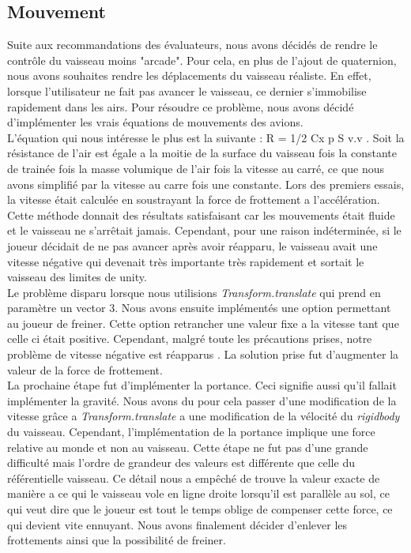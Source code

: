 \documentclass[10pt, titlepage]{report}
\begin{document}
\subsection{Mouvement}
Suite aux recommandations des évaluateurs, nous avons décidés de rendre le contrôle du vaisseau moins "arcade". Pour cela, en plus de l'ajout de quaternion, nous avons souhaites rendre les déplacements du vaisseau réaliste. En effet, lorsque l'utilisateur ne fait pas avancer le vaisseau, ce dernier s'immobilise rapidement dans les airs. Pour résoudre ce problème, nous avons décidé d'implémenter les vrais équations de mouvements des avions.\\

 L'équation qui nous intéresse le plus est la suivante : R = 1/2 Cx  p S v.v . Soit la résistance de l'air est égale a la moitie de la surface du vaisseau fois la constante de trainée fois la masse volumique de l'air fois la vitesse au carré, ce que nous avons simplifié par la vitesse au carre fois une constante. Lors des premiers essais, la vitesse était calculée en soustrayant la force de frottement a l'accélération. Cette méthode donnait des résultats satisfaisant car les mouvements était fluide et le vaisseau ne s'arrêtait jamais. Cependant, pour une raison indéterminée, si le joueur décidait de ne pas avancer après avoir réapparu, le vaisseau avait une vitesse négative qui devenait très importante très rapidement et sortait le vaisseau des limites de unity.\\

Le problème disparu lorsque nous utilisions \textit{Transform.translate} qui prend en paramètre un vector 3. Nous avons ensuite implémentés une option permettant au joueur de freiner. Cette option retrancher une valeur fixe a la vitesse tant que celle ci était positive. Cependant, malgré toute les précautions prises, notre problème de vitesse négative est réapparus . La solution prise fut d'augmenter la valeur de la force de frottement.\\

La prochaine étape fut d'implémenter la portance. Ceci signifie aussi qu'il fallait implémenter la gravité. Nous avons du pour cela passer d'une modification de la vitesse grâce a \textit{Transform.translate} a une modification de la vélocité du \textit{rigidbody} du vaisseau. Cependant, l'implémentation de la portance implique une force relative au monde et non au vaisseau. Cette étape ne fut pas d'une grande difficulté mais l'ordre de grandeur des valeurs est différente que celle du référentielle vaisseau. Ce détail nous a empêché de trouve la valeur exacte de manière a ce qui le vaisseau vole en ligne droite lorsqu'il est parallèle au sol, ce qui veut dire que le joueur est tout le temps oblige de compenser cette force, ce qui devient vite ennuyant. Nous avons finalement décider d'enlever les frottements ainsi que la possibilité de freiner.\\
\end{document}
